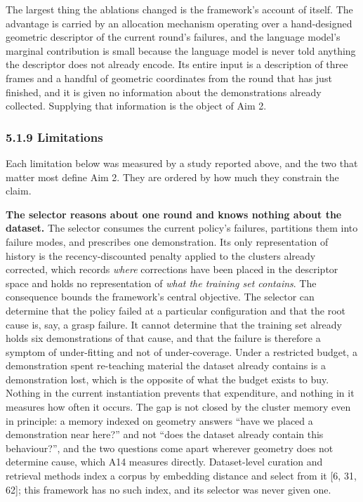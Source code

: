 \documentclass[
  11pt,
]{article}
\begin{document}
The largest thing the ablations changed is the framework's account of
itself. The advantage is carried by an allocation mechanism operating
over a hand-designed geometric descriptor of the current round's
failures, and the language model's marginal contribution is small
because the language model is never told anything the descriptor does
not already encode. Its entire input is a description of three frames
and a handful of geometric coordinates from the round that has just
finished, and it is given no information about the demonstrations
already collected. Supplying that information is the object of Aim 2.

\hypertarget{limitations}{%
\subsubsection{5.1.9 Limitations}\label{limitations}}

Each limitation below was measured by a study reported above, and the
two that matter most define Aim 2. They are ordered by how much they
constrain the claim.

\textbf{The selector reasons about one round and knows nothing about the
dataset.} The selector consumes the current policy's failures,
partitions them into failure modes, and prescribes one demonstration.
Its only representation of history is the recency-discounted penalty
applied to the clusters already corrected, which records \emph{where}
corrections have been placed in the descriptor space and holds no
representation of \emph{what the training set contains}. The consequence
bounds the framework's central objective. The selector can determine
that the policy failed at a particular configuration and that the root
cause is, say, a grasp failure. It cannot determine that the training
set already holds six demonstrations of that cause, and that the failure
is therefore a symptom of under-fitting and not of under-coverage. Under
a restricted budget, a demonstration spent re-teaching material the
dataset already contains is a demonstration lost, which is the opposite
of what the budget exists to buy. Nothing in the current instantiation
prevents that expenditure, and nothing in it measures how often it
occurs. The gap is not closed by the cluster memory even in principle: a
memory indexed on geometry answers ``have we placed a demonstration near
here?'' and not ``does the dataset already contain this behaviour?'',
and the two questions come apart wherever geometry does not determine
cause, which A14 measures directly. Dataset-level curation and retrieval
methods index a corpus by embedding distance and select from it {[}6,
31, 62{]}; this framework has no such index, and its selector was never
given one.
\end{document}
